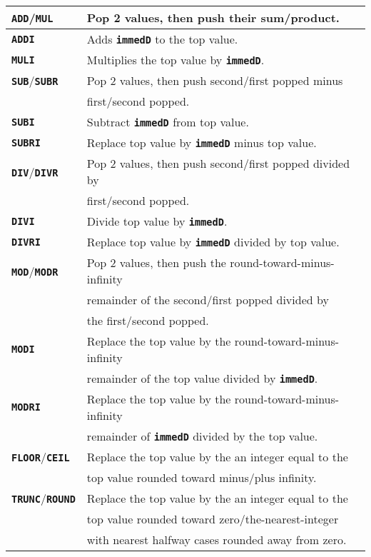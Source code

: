 \documentclass[12pt]{article}
\newcommand{\TT}[1]{{\tt \bfseries #1}}
\newlength{\figurewidth}
\newenvironment{boxedfigure}[1][!btp]%
	{\begin{figure*}[#1]
	 \begin{lrbox}{\figurebox}
	 \begin{minipage}{\figurewidth}

	 \vspace*{1ex}}%
	{
	 \vspace*{1ex}

	 \end{minipage}
	 \end{lrbox}

	 \centering
	 \fbox{\hspace*{0.1in}\usebox{\figurebox}\hspace*{0.1in}}
	 \end{figure*}}
\begin{document}
\begin{boxedfigure}

\begin{center}
\begin{tabular}{|l|l|}
\hline
\TT{ADD}/\TT{MUL}
    & Pop 2 values, then push their sum/product.
\\\hline
\TT{ADDI}
    & Adds \TT{immedD} to the top value.
\\\hline
\TT{MULI}
    & Multiplies the top value by \TT{immedD}.
\\\hline
\TT{SUB}/\TT{SUBR}
    & Pop 2 values, then push second/first popped minus \\
    & first/second popped.
\\\hline
\TT{SUBI}
    & Subtract \TT{immedD} from top value.
\\\hline
\TT{SUBRI}
    & Replace top value by \TT{immedD} minus top value.
\\\hline
\TT{DIV}/\TT{DIVR}
    & Pop 2 values, then push second/first popped divided by\\
    & first/second popped.
\\\hline
\TT{DIVI}
    & Divide top value by \TT{immedD}.
\\\hline
\TT{DIVRI}
    & Replace top value by \TT{immedD} divided by top value.
\\\hline
\TT{MOD}/\TT{MODR}
    & Pop 2 values, then push the round-toward-minus-infinity \\
    & remainder of the second/first popped divided by \\
    & the first/second popped.
\\\hline
\TT{MODI}
    & Replace the top value by the round-toward-minus-infinity \\
    & remainder of the top value divided by \TT{immedD}.
\\\hline
\TT{MODRI}
    & Replace the top value by the round-toward-minus-infinity \\
    & remainder of \TT{immedD} divided by the top value.
\\\hline
\TT{FLOOR}/\TT{CEIL}
    & Replace the top value by the an integer equal to the \\
    & top value rounded toward minus/plus infinity.
\\\hline
\TT{TRUNC}/\TT{ROUND}
    & Replace the top value by the an integer equal to the \\
    & top value rounded toward zero/the-nearest-integer \\
    & with nearest halfway cases rounded away from zero.

\end{tabular}
\end{center}
\end{boxedfigure}
\end{document}
